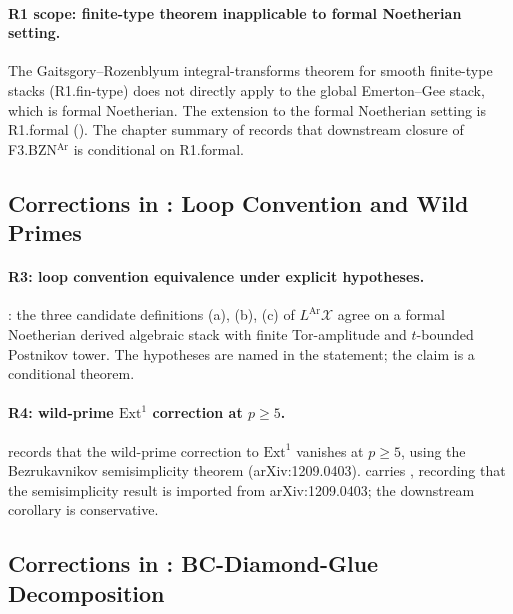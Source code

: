 \paragraph{R1 scope: finite-type theorem inapplicable to formal Noetherian setting.}
The Gaitsgory--Rozenblyum integral-transforms theorem for smooth
finite-type stacks (R1.fin-type) does not directly apply to the
global Emerton--Gee stack, which is formal Noetherian. The
extension to the formal Noetherian setting is R1.formal
(\ClaimStatusConjectured). The chapter summary of
 records that downstream closure of
F3.BZN\({}^{\mathrm{Ar}}\) is conditional on R1.formal.

\subsection{Corrections in : Loop Convention and Wild Primes}
\label{v4-arith:w3-audit-A:ch33}

\paragraph{R3: loop convention equivalence under explicit hypotheses.}
\ClaimStatusProvedHere: the three candidate definitions (a), (b),
(c) of \(L^{\mathrm{Ar}}\mathcal{X}\) agree on a formal Noetherian
derived algebraic stack with finite Tor-amplitude and
\(t\)-bounded Postnikov tower. The hypotheses are named in the
statement; the claim is a conditional theorem.

\paragraph{R4: wild-prime \(\mathrm{Ext}^1\) correction at \(p\geq 5\).}
records that the wild-prime correction to
\(\mathrm{Ext}^1\) vanishes at \(p\geq 5\), using the
Bezrukavnikov semisimplicity theorem (arXiv:1209.0403).
 carries
\ClaimStatusNeedsVerification, recording that the semisimplicity
result is imported from arXiv:1209.0403; the downstream corollary
is conservative.

\subsection{Corrections in : BC-Diamond-Glue Decomposition}
\label{v4-arith:w3-audit-A:ch35}

